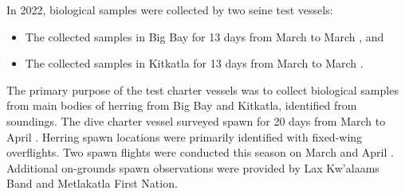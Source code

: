 In 2022, biological samples were collected by two seine test vessels:

\begin{itemize}

\item The  collected samples in Big Bay for 13 days
from March  to March , and

\item The  collected samples in Kitkatla for 13 days
from March  to March .

\end{itemize}

The primary purpose of the test charter vessels was to collect biological samples
from main bodies of herring from Big Bay and Kitkatla,
identified from soundings.
The dive charter vessel  surveyed spawn for 20 days
from March  to April .
Herring spawn locations were primarily identified with fixed-wing overflights.
Two spawn flights were conducted this season on March  and April .
Additional on-grounds spawn observations were provided by
Lax Kw'alaams Band and Metlakatla First Nation.

